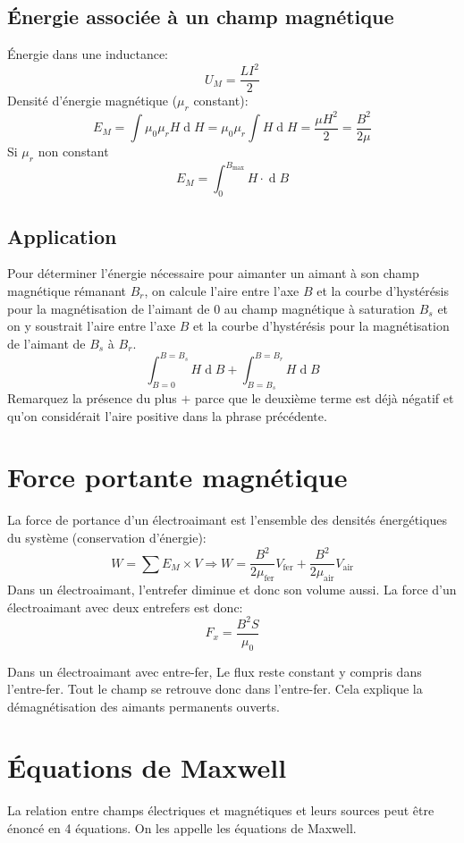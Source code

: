 \documentclass[11pt,a4paper]{article}
\DeclareMathOperator{\diff}{d}
\newcommand{\dif}{\diff\!}
\begin{document}
\subsection{Énergie associée à un champ magnétique}
Énergie dans une inductance:
\[ U_M = \frac{LI^2}{2} \]
Densité d'énergie magnétique ($\mu_r$ constant):
\[ E_M = \int \mu_0 \mu_r H \dif H = \mu_0 \mu_r \int H \dif H = \frac{\mu H^2}{2} = \frac{B^2}{2\mu} \]
Si $\mu_r$ non constant
\[ E_M = \int_0^{B_\mathrm{max}} H \cdot \dif B \]

\subsection{Application}
Pour déterminer l'énergie nécessaire pour aimanter un aimant à son champ magnétique rémanant $B_r$,
on calcule l'aire entre l'axe $B$ et la courbe d'hystérésis pour la magnétisation de l'aimant de 0 au champ magnétique à saturation $B_s$ et on y soustrait l'aire entre l'axe $B$ et la courbe d'hystérésis pour la magnétisation de l'aimant de $B_s$ à $B_r$.
\[ \int_{B = 0}^{B = B_s} H \dif B + \int_{B = B_s}^{B = B_r} H \dif B \]
Remarquez la présence du plus $+$ parce que le deuxième terme est déjà négatif et qu'on considérait l'aire positive dans la phrase précédente.

\section{Force portante magnétique}
La force de portance d'un électroaimant est l'ensemble des densités énergétiques du système (conservation d'énergie):
$$W = \sum E_M \times V \Rightarrow W = \frac{B^2}{2\mu_\mathrm{fer}}V_\mathrm{fer} + \frac{B^2}{2\mu_\mathrm{air}}V_\mathrm{air}$$
Dans un électroaimant, l'entrefer diminue et donc son volume aussi.
La force d'un électroaimant avec deux entrefers est donc:
\[ F_x = \frac{B^2S}{\mu_0} \]

Dans un électroaimant avec entre-fer, Le flux reste constant y compris dans l'entre-fer.
Tout le champ se retrouve donc dans l'entre-fer.
Cela explique la démagnétisation des aimants permanents ouverts.

\section{Équations de Maxwell}
La relation entre champs électriques et magnétiques et leurs sources peut être énoncé en 4 équations.
On les appelle les équations de Maxwell.
\end{document}
